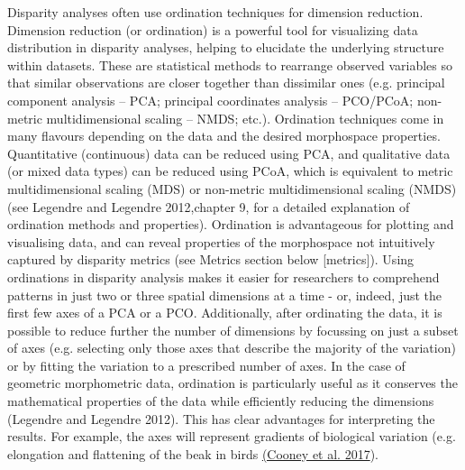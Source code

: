 \documentclass[12pt,letterpaper]{article}
\begin{document}
Disparity analyses often use ordination techniques for dimension reduction.
Dimension reduction (or ordination) is a powerful tool for visualizing data distribution in disparity analyses, helping to elucidate the underlying structure within datasets.
These are statistical methods to rearrange observed variables so that similar observations are closer together than dissimilar ones (e.g. principal component analysis -- PCA; principal coordinates analysis -- PCO/PCoA; non-metric multidimensional scaling -- NMDS; etc.).
Ordination techniques come in many flavours depending on the data and the desired morphospace properties.
Quantitative (continuous) data can be reduced using PCA, and qualitative data (or mixed data types) can be reduced using PCoA, which is equivalent to metric multidimensional scaling (MDS) or non-metric multidimensional scaling (NMDS) (see Legendre and Legendre 2012,chapter 9, for a detailed explanation of ordination methods and properties).
Ordination is advantageous for plotting and visualising data, and can reveal properties of the morphospace not intuitively captured by disparity metrics (see Metrics section below {[}metrics{]}).
Using ordinations in disparity analysis makes it easier for researchers to comprehend patterns in just two or three spatial dimensions at a time - or, indeed, just the first few axes of a PCA or a PCO.
Additionally, after ordinating the data, it is possible to reduce further the number of dimensions by focussing on just a subset of axes (e.g. selecting only those axes that describe the majority of the variation) or by fitting the variation to a prescribed number of axes.
In the case of geometric morphometric data, ordination is particularly useful as it conserves the mathematical properties of the data while efficiently reducing the dimensions (Legendre and Legendre 2012). %
This has clear advantages for interpreting the results.
For example, the axes will represent gradients of biological variation (e.g. elongation and flattening of the beak in birds \href{https://paperpile.com/c/sTGYvp/RjqE}{(Cooney et al. 2017}).
\end{document}
